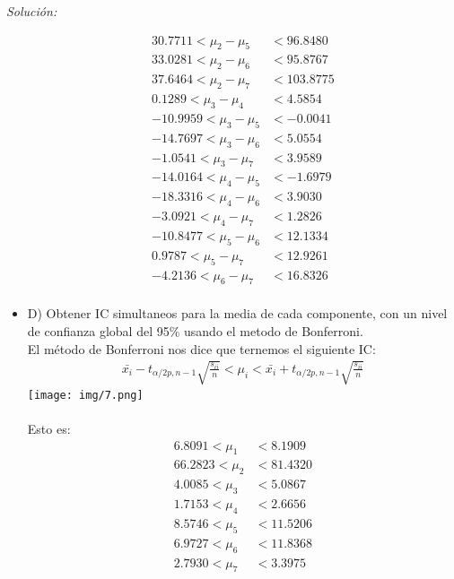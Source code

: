 \documentclass[12pt]{article}
\newenvironment{sol}
    {\emph{Solución:}
    }
    {
    }
\begin{document}
\begin{sol}
\begin{itemize}
\begin{align*}
 30.7711 < \mu_{2} - \mu_{5} &< 96.8480 \\
 33.0281 < \mu_{2} - \mu_{6} &< 95.8767 \\
 37.6464 < \mu_{2} - \mu_{7} &< 103.8775 \\
 0.1289 < \mu_{3} - \mu_{4} &< 4.5854 \\
 -10.9959 < \mu_{3} - \mu_{5} &< -0.0041 \\
 -14.7697 < \mu_{3} - \mu_{6} &< 5.0554 \\
 -1.0541 < \mu_{3} - \mu_{7} &< 3.9589 \\
 -14.0164 < \mu_{4} - \mu_{5} &< -1.6979 \\
 -18.3316 < \mu_{4} - \mu_{6} &< 3.9030 \\
 -3.0921 < \mu_{4} - \mu_{7} &< 1.2826 \\
 -10.8477 < \mu_{5} - \mu_{6} &< 12.1334 \\
 0.9787 < \mu_{5} - \mu_{7} &< 12.9261 \\
 -4.2136 < \mu_{6} - \mu_{7} &< 16.8326 \\
\end{align*}
\pagebreak
\item D) Obtener IC simultaneos para la media de cada componente, con un nivel de confianza  
global del 95\% usando el metodo de Bonferroni. \\
El método de Bonferroni nos dice que ternemos el siguiente IC:
\begin{align*}
\bar{x_i}-t_{\alpha / 2p,n-1}\sqrt{\frac{s_{ii}}{n}}<\mu_i<\bar{x_i}+t_{\alpha / 2p,n-1}\sqrt{\frac{s_{ii}}{n}}
\end{align*}
\texttt{[image: img/7.png]}\\\\
Esto es:
\begin{align*}
6.8091 < \mu_1 &< 8.1909 \\
66.2823 < \mu_2 &< 81.4320 \\
4.0085 < \mu_3 &< 5.0867 \\
1.7153 < \mu_4 &< 2.6656 \\
8.5746 < \mu_5 &< 11.5206 \\
6.9727 < \mu_6 &< 11.8368 \\
2.7930 < \mu_7 &< 3.3975 \\
\end{align*}
\end{itemize}
\end{sol}


\end{document}
